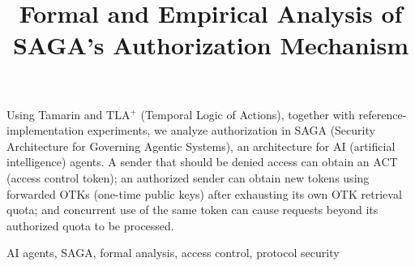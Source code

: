 \documentclass[letter]{ieice}
\title{Formal and Empirical Analysis of SAGA's Authorization Mechanism}
\begin{document}
\maketitle
\raggedbottom
\begin{summary}
Using Tamarin and TLA$^{+}$ (Temporal Logic of Actions), together with reference-implementation experiments, we analyze authorization in SAGA (Security Architecture for Governing Agentic Systems), an architecture for AI (artificial intelligence) agents. A sender that should be denied access can obtain an ACT (access control token); an authorized sender can obtain new tokens using forwarded OTKs (one-time public keys) after exhausting its own OTK retrieval quota; and concurrent use of the same token can cause requests beyond its authorized quota to be processed.
\end{summary}
\begin{keywords}
AI agents, SAGA, formal analysis, access control, protocol security
\end{keywords}









\end{document}
